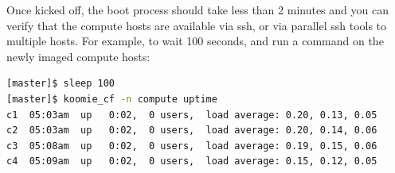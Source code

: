 \documentclass[letterpaper]{article}
\begin{document}

\vspace*{0.25cm}
Once kicked off, the boot process should take less than 2 minutes and you can
verify that the compute hosts are available via ssh, or via parallel ssh tools to multiple
hosts. For example, to wait 100 seconds, and run a command on the newly imaged
compute hosts:


\vspace*{0.2cm}
\begin{lstlisting}[language=bash]
[master]$ sleep 100
[master]$ koomie_cf -n compute uptime
c1  05:03am  up   0:02,  0 users,  load average: 0.20, 0.13, 0.05
c2  05:03am  up   0:02,  0 users,  load average: 0.20, 0.14, 0.06
c3  05:08am  up   0:02,  0 users,  load average: 0.19, 0.15, 0.06
c4  05:09am  up   0:02,  0 users,  load average: 0.15, 0.12, 0.05
\end{lstlisting}

\end{document}
